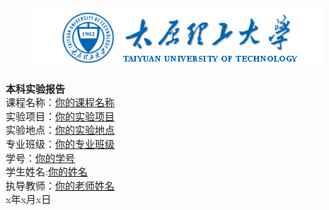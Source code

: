 \documentclass[16px,a4paper,twoside]{article}
\begin{document}
\begin{figure}
\centering
\includegraphics{logo.png}
\end{figure}

\begin{center}
\begin{doublespacing}
\huge{\textbf{本科实验报告}}\\
课程名称：\underline{你的课程名称}\\
实验项目：\underline{你的实验项目}\\
实验地点：\underline{你的实验地点}\\
专业班级：\underline{你的专业班级}\\
学号：\underline{你的学号}\\
学生姓名:\underline{你的姓名}\\
执导教师：\underline{你的老师姓名}\\
x年x月x日\\
\end{doublespacing}
\end{center}
\end{document}
